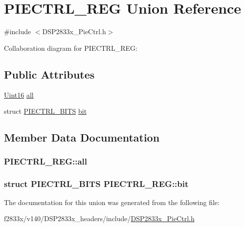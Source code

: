 \hypertarget{union_p_i_e_c_t_r_l___r_e_g}{}\section{P\+I\+E\+C\+T\+R\+L\+\_\+\+R\+E\+G Union Reference}
\label{union_p_i_e_c_t_r_l___r_e_g}


{\ttfamily \#include $<$D\+S\+P2833x\+\_\+\+Pie\+Ctrl.\+h$>$}



Collaboration diagram for P\+I\+E\+C\+T\+R\+L\+\_\+\+R\+E\+G\+:
\subsection*{Public Attributes}
\begin{DoxyCompactItemize}
\item 
\hyperlink{_d_s_p2833x___device_8h_a59a9f6be4562c327cbfb4f7e8e18f08b}{Uint16} \hyperlink{union_p_i_e_c_t_r_l___r_e_g_aff2b8f403e1e2fc9e0def3f7f7aac6a1}{all}
\item 
struct \hyperlink{struct_p_i_e_c_t_r_l___b_i_t_s}{P\+I\+E\+C\+T\+R\+L\+\_\+\+B\+I\+T\+S} \hyperlink{union_p_i_e_c_t_r_l___r_e_g_ab616891cb8f1ad9f57a8e46d4acbe3a9}{bit}
\end{DoxyCompactItemize}


\subsection{Member Data Documentation}
\hypertarget{union_p_i_e_c_t_r_l___r_e_g_aff2b8f403e1e2fc9e0def3f7f7aac6a1}{}
\subsubsection[{all}]{ P\+I\+E\+C\+T\+R\+L\+\_\+\+R\+E\+G\+::all}\label{union_p_i_e_c_t_r_l___r_e_g_aff2b8f403e1e2fc9e0def3f7f7aac6a1}
\hypertarget{union_p_i_e_c_t_r_l___r_e_g_ab616891cb8f1ad9f57a8e46d4acbe3a9}{}
\subsubsection[{bit}]{\setlength{\rightskip}{0pt plus 5cm}struct {\bf P\+I\+E\+C\+T\+R\+L\+\_\+\+B\+I\+T\+S} P\+I\+E\+C\+T\+R\+L\+\_\+\+R\+E\+G\+::bit}\label{union_p_i_e_c_t_r_l___r_e_g_ab616891cb8f1ad9f57a8e46d4acbe3a9}


The documentation for this union was generated from the following file\+:\begin{DoxyCompactItemize}
\item 
f2833x/v140/\+D\+S\+P2833x\+\_\+headers/include/\hyperlink{_d_s_p2833x___pie_ctrl_8h}{D\+S\+P2833x\+\_\+\+Pie\+Ctrl.\+h}\end{DoxyCompactItemize}
